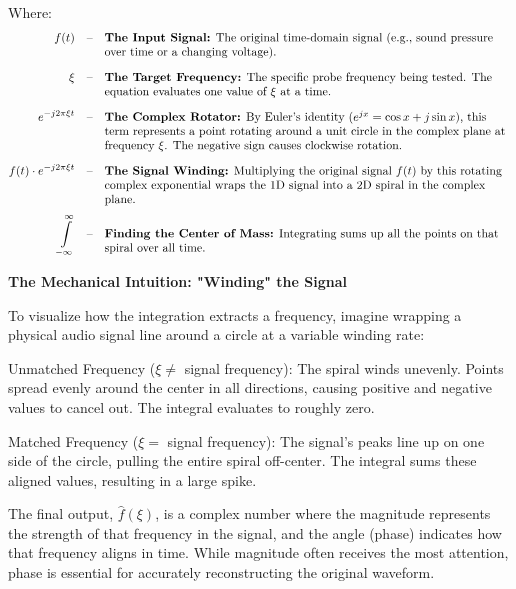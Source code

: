 Where:
\begin{align*}
    f(t) &\quad\text{--}\quad \parbox[t]{12cm}{\raggedright \textbf{The Input Signal:} The original time-domain signal (e.g., sound pressure over time or a changing voltage).} \\[1.5ex]
    \xi &\quad\text{--}\quad \parbox[t]{12cm}{\raggedright \textbf{The Target Frequency:} The specific probe frequency being tested. The equation evaluates one value of $\xi$ at a time.} \\[1.5ex]
    e^{-j2\pi \xi t} &\quad\text{--}\quad \parbox[t]{12cm}{\raggedright \textbf{The Complex Rotator:} By Euler's identity ($e^{jx}=\cos x + j \sin x$), this term represents a point rotating around a unit circle in the complex plane at frequency $\xi$. The negative sign causes clockwise rotation.} \\[1.5ex]
    f(t)\cdot e^{-j2\pi \xi t} &\quad\text{--}\quad \parbox[t]{12cm}{\raggedright \textbf{The Signal Winding:} Multiplying the original signal $f(t)$ by this rotating complex exponential wraps the 1D signal into a 2D spiral in the complex plane.} \\[0.75ex]
    \int\limits_{-\infty}^{\infty} &\quad\text{--}\quad \parbox[t]{12cm}{\raggedright \textbf{Finding the Center of Mass:} Integrating sums up all the points on that spiral over all time.}
\end{align*}

\textbf{The Mechanical Intuition: "Winding" the Signal}

To visualize how the integration extracts a frequency, imagine wrapping a physical audio signal line around a circle at a variable winding rate:
\begin{compactenum}
    \item Unmatched Frequency ($\xi \ne$ signal frequency): The spiral winds unevenly. Points spread evenly around the center in all directions, causing positive and negative values to cancel out. The integral evaluates to roughly zero.
    \item Matched Frequency ($\xi =$ signal frequency): The signal's peaks line up on one side of the circle, pulling the entire spiral off-center. The integral sums these aligned values, resulting in a large spike.
\end{compactenum}

The final output, $\hat{f}(\xi)$, is a complex number where the magnitude represents the strength of that frequency in the signal, and the angle (phase) indicates how that frequency aligns in time. While magnitude often receives the most attention, phase is essential for accurately reconstructing the original waveform.

